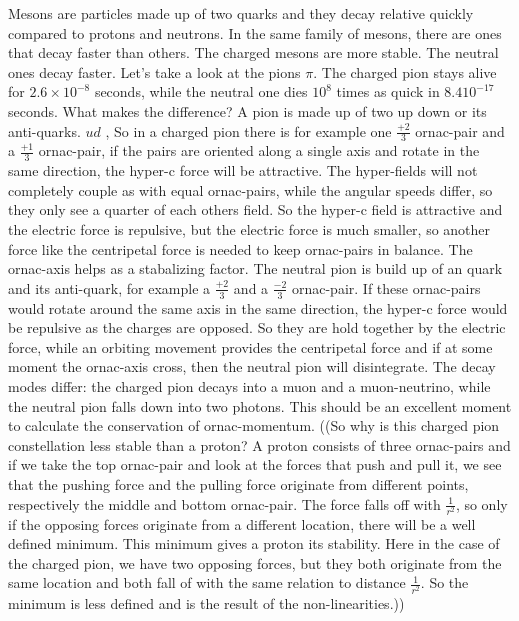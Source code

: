 Mesons are particles made up of two quarks and they decay relative quickly compared to protons and neutrons. In the same family of mesons, there are ones that decay faster than others. The charged mesons are more stable. The neutral ones decay faster. Let's take a look at the pions $\pi$. The charged pion stays alive for $2.6×10^{-8}$ seconds, while the neutral one dies $10^8$ times as quick in $8.4 10^{-17}$ seconds.
What makes the difference? A pion is made up of two up down or its anti-quarks. $ud$ , So in a charged pion there is for example one $\frac{+2}{3}$ ornac-pair and a $\frac{+1}{3}$ ornac-pair, if the pairs are oriented along a single axis and rotate in the same direction, the hyper-c force will be attractive. The hyper-fields will not completely couple as with equal ornac-pairs, while the angular speeds differ, so they only see a quarter of each others field. So the hyper-c field is attractive and the electric force is repulsive, but the electric force is much smaller, so another force like the centripetal force is needed to keep ornac-pairs in balance. The ornac-axis helps as a stabalizing factor.
The neutral pion is build up of an quark and its anti-quark, for example a  $\frac{+2}{3}$ and a  $\frac{-2}{3}$ ornac-pair. If these ornac-pairs would rotate around the same axis in the same direction, the hyper-c force would be repulsive as the charges are opposed. So they are hold together by the electric force, while an orbiting movement provides the centripetal force and if at some moment the ornac-axis cross, then the neutral pion will disintegrate.
The decay modes differ: the charged pion decays into a muon and a muon-neutrino, while the neutral pion falls down into two photons. This should be an excellent moment to calculate the conservation of ornac-momentum.
((So why is this charged pion constellation less stable than a proton?
A proton consists of three ornac-pairs and if we take the top ornac-pair and look at the forces that push and pull it, we see that the pushing force and the pulling force originate from different points, respectively the middle and bottom ornac-pair. The force falls off with $\frac{1}{r^2}$, so only if the opposing forces originate from a different location, there will be a well defined minimum. This minimum gives a proton its stability.
Here in the case of the charged pion, we have two opposing forces, but they both originate from the same location and both fall of with the same relation to distance  $\frac{1}{r^2}$. So the minimum is less defined and is the result of the non-linearities.))


